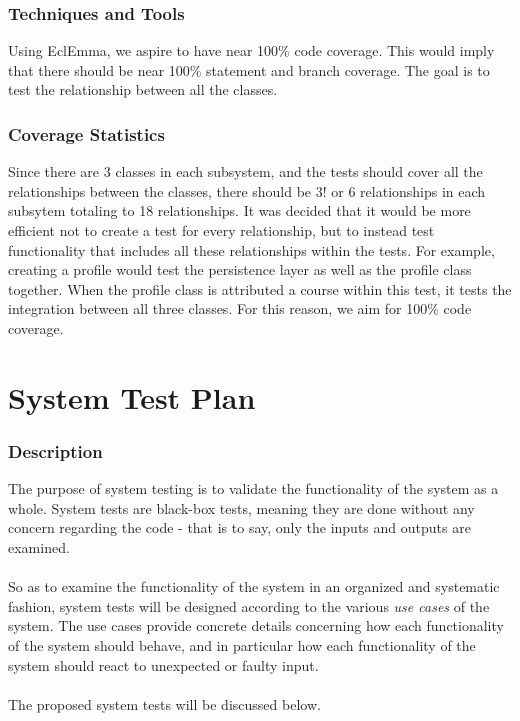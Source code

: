 \documentclass[12pt]{report}
\begin{document}
\section{Techniques and Tools}
Using EclEmma, we aspire to have near 100\% code coverage. This would imply that there should be near 100\% statement and branch coverage. The goal is to test the relationship between all the classes.

\section{Coverage Statistics}
Since there are 3 classes in each subsystem, and the tests should cover all the relationships
between the classes, there should be 3! or 6 relationships in each subsytem totaling to 18
relationships. It was decided that it would be more efficient not to create a test for every
relationship, but to instead test functionality that includes all these relationships within the
tests. For example, creating a profile would test the persistence layer as well as the profile class
together. When the profile class is attributed a course within this test, it tests the integration
between all three classes. For this reason, we aim for 100\% code coverage.

\part{System Test Plan}
\section{Description}
The purpose of system testing is to validate the functionality of the system as a whole. System
tests are black-box tests, meaning they are done without any concern regarding the code - that is to
say, only the inputs and outputs are examined.\\\\
So as to examine the functionality of the system in an organized and systematic fashion, system
tests will be designed according to the various \textit{use cases} of the system. The use cases
provide concrete details concerning how each functionality of the system should behave, and in
particular how each functionality of the system should react to unexpected or faulty input.\\\\
The proposed system tests will be discussed below.
\end{document}
